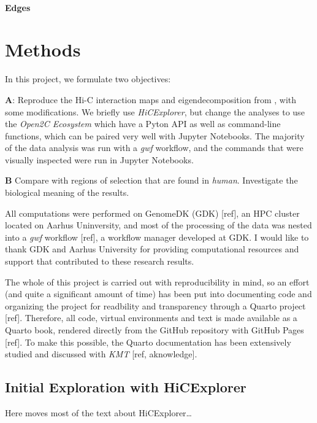 \documentclass[
  11pt,
  a4paper,
]{scrbook}
\let\oldemph\emph
\renewcommand\emph[1]{\oldemph{\color{gray}#1}}
\begin{document}
\subsubsection{Edges}\label{edges}

\chapter{Methods}\label{methods}

In this project, we formulate two objectives:

\textbf{A}: Reproduce the Hi-C interaction maps and eigendecomposition
from \citep{wang_reprogramming_2019}, with some modifications. We
briefly use \emph{HiCExplorer}, but change the analyses to use the
\emph{Open2C Ecosystem} \citep{open2c} which have a Pyton API as well as
command-line functions, which can be paired very well with Jupyter
Notebooks. The majority of the data analysis was run with a \emph{gwf}
workflow, and the commands that were visually inspected were run in
Jupyter Notebooks.

\textbf{B} Compare with regions of selection that are found in
\emph{human}. Investigate the biological meaning of the results.

All computations were performed on GenomeDK (GDK) {[}ref{]}, an HPC
cluster located on Aarhus Uninversity, and most of the processing of the
data was nested into a \emph{gwf} workflow {[}ref{]}, a workflow manager
developed at GDK. I would like to thank GDK and Aarhus University for
providing computational resources and support that contributed to these
research results.

The whole of this project is carried out with reproducibility in mind,
so an effort (and quite a significant amount of time) has been put into
documenting code and organizing the project for readbility and
transparency through a Quarto project {[}ref{]}. Therefore, all code,
virtual environments and text is made available as a Quarto book,
rendered directly from the GitHub repository with GitHub Pages
{[}ref{]}. To make this possible, the Quarto documentation has been
extensively studied and discussed with \emph{KMT} {[}ref, aknowledge{]}.

\section{Initial Exploration with
HiCExplorer}\label{initial-exploration-with-hicexplorer}

Here moves most of the text about HiCExplorer\ldots{}
\end{document}
